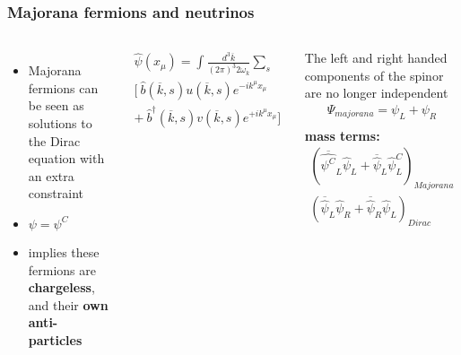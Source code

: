 \documentclass{beamer}
\begin{document}
	\begin{frame}
		\frametitle{Majorana fermions and neutrinos}
		\begin{columns}[c] %
			
			\begin{itemize}
			\item Majorana fermions can be seen as solutions to the Dirac equation with an extra constraint
			\item $\psi = \psi^C$
			\item implies these fermions are \textbf{chargeless}, and their \textbf{own anti-particles}
			\end{itemize}
			\begin{eqnarray*}
			\hat{\psi}(x_{\mu}) = \int \frac{d^3 \overline{k}}{(2\pi)^3 2 \omega_k} \sum_s \\
			\bigg[\ \hat{b}(\overline{k},s)u(\overline{k},s)e^{-ik^{\mu}x_{\mu}} \\
			 + \ \hat{b}^{\dagger}(\overline{k},s)v(\overline{k},s)e^{+ik^{\mu}x_{\mu}} \bigg]
			\end{eqnarray*}
			
			{\footnotesize The left and right handed components of the spinor are no longer independent}
			\begin{eqnarray*}
			\Psi_{majorana} = \psi_L + \psi_R \\
			\end{eqnarray*}
			{\footnotesize \textbf{mass terms:}}
			\begin{eqnarray*}
			\left( \overline{\hat{\psi^C}}_L \hat{\psi}_L + \overline{\hat{\psi}}_L \hat{\psi}^C_L \right)_{Majorana} \\
			 \left(\overline{\hat{\psi}}_L \hat{\psi}_R + \overline{\hat{\psi}}_R \hat{\psi}_L\right)_{Dirac}
			\end{eqnarray*}
			
		\end{columns}
	\end{frame}	
	
\end{document}
